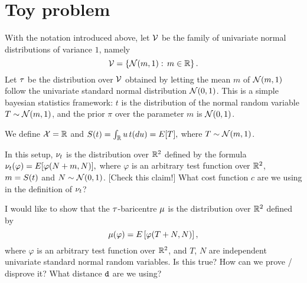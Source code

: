 \section{Toy problem}

With the notation introduced above,
let
$
\givenFamily
$ 
be the family of 
univariate normal distributions
of variance $1$,
namely
\begin{equation*}
\givenFamily 
= 
\left\lbrace
\gaussian{m}{1}:
\,
m\in \R
\right\rbrace.
\end{equation*}
Let 
$
\familiyDistribution
$
be
the distribution over $\givenFamily$
obtained by letting 
the mean $m$ of $\gaussian{m}{1}$ 
follow the univariate standard normal distribution 
$\gaussian{0}{1}$. 
This is a simple bayesian statistics framework:
$t$ is the distribution of the normal random variable
$T \sim \gaussian{m}{1}$, 
and the prior $\pi$ over the parameter $m$ is $\gaussian{0}{1}$.

We define 
$\statisticsSpace = \R$ 
and 
$\statistics(t) = \int_{\R} u\,t(du) = \Expectation[T], $ 
where 
$T \sim \gaussian{m}{1}$.

In this setup,
$\coupling[t]$
is the distribution over $\R\squared$
defined by the formula
$
\coupling[t](\varphi)
=
\Expectation[
\varphi(N + m, N)
],
$
where 
$\varphi$ is an arbitrary test function over $\R\squared$,
$m = \statistics(t)$
and
$N\sim\gaussian{0}{1}$. 
[Check this claim!]
What 
cost function $c$ 
are we using in the definition of 
$\coupling[t]$?

I would like to show that 
the $\familiyDistribution$-baricentre $\baricentre$
is the distribution over $\R\squared$
defined by
\begin{equation*}
	\baricentre(\varphi)
	=
	\Expectation
	\left[
		\varphi
		(
		T+N,
		N
		)
	\right],
\end{equation*}
where 
$\varphi$ is an arbitrary test function over $\R\squared$,
and
$T$, $N$ are independent univariate standard normal random variables. 
Is this true? How can we prove / disprove it? 
What
distance $\bariDistance$ are we using?



